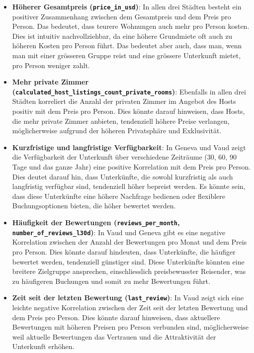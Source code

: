 \documentclass[
  journal,
]{IEEEtran}%
\begin{document}
\begin{itemize}
\item
  \textbf{Höherer Gesamtpreis (\texttt{price\_in\_usd})}: In allen drei
  Städten besteht ein positiver Zusammenhang zwischen dem Gesamtpreis
  und dem Preis pro Person. Das bedeutet, dass teurere Wohnungen auch
  mehr pro Person kosten. Dies ist intuitiv nachvollziehbar, da eine
  höhere Grundmiete oft auch zu höheren Kosten pro Person führt. Das
  bedeutet aber auch, dass man, wenn man mit einer grösseren Gruppe
  reist und eine grössere Unterkunft mietet, pro Person weniger zahlt.
\item
  \textbf{Mehr private Zimmer
  (\texttt{calculated\_host\_listings\_count\_private\_rooms})}:
  Ebenfalls in allen drei Städten korreliert die Anzahl der privaten
  Zimmer im Angebot des Hosts positiv mit dem Preis pro Person. Dies
  könnte darauf hinweisen, dass Hosts, die mehr private Zimmer anbieten,
  tendenziell höhere Preise verlangen, möglicherweise aufgrund der
  höheren Privatsphäre und Exklusivität.
\item
  \textbf{Kurzfristige und langfristige Verfügbarkeit}: In Geneva und
  Vaud zeigt die Verfügbarkeit der Unterkunft über verschiedene
  Zeiträume (30, 60, 90 Tage und das ganze Jahr) eine positive
  Korrelation mit dem Preis pro Person. Dies deutet darauf hin, dass
  Unterkünfte, die sowohl kurzfristig als auch langfristig verfügbar
  sind, tendenziell höher bepreist werden. Es könnte sein, dass diese
  Unterkünfte eine höhere Nachfrage bedienen oder flexiblere
  Buchungsoptionen bieten, die höher bewertet werden.
\item
  \textbf{Häufigkeit der Bewertungen (\texttt{reviews\_per\_month},
  \texttt{number\_of\_reviews\_l30d})}: In Vaud und Geneva gibt es eine
  negative Korrelation zwischen der Anzahl der Bewertungen pro Monat und
  dem Preis pro Person. Dies könnte darauf hindeuten, dass Unterkünfte,
  die häufiger bewertet werden, tendenziell günstiger sind. Diese
  Unterkünfte könnten eine breitere Zielgruppe ansprechen,
  einschliesslich preisbewusster Reisender, was zu häufigeren Buchungen
  und somit zu mehr Bewertungen führt.
\item
  \textbf{Zeit seit der letzten Bewertung (\texttt{last\_review})}: In
  Vaud zeigt sich eine leichte negative Korrelation zwischen der Zeit
  seit der letzten Bewertung und dem Preis pro Person. Dies könnte
  darauf hinweisen, dass aktuellere Bewertungen mit höheren Preisen pro
  Person verbunden sind, möglicherweise weil aktuelle Bewertungen das
  Vertrauen und die Attraktivität der Unterkunft erhöhen.

\end{itemize}
\end{document}
